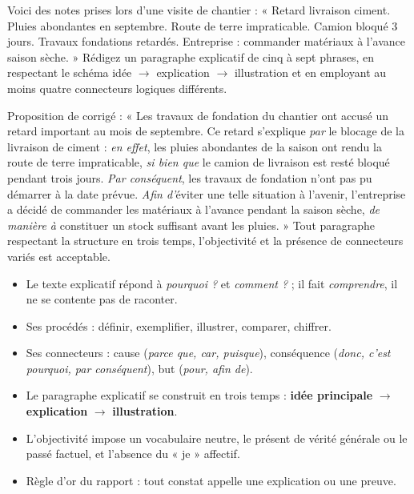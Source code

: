 \documentclass[11pt]{article}
\newcommand{\cle}[1]{{\popxbold\color{popdark}#1}}
\begin{document}
\begin{exercice}
Voici des notes prises lors d'une visite de chantier : « Retard livraison ciment. Pluies abondantes en septembre. Route de terre impraticable. Camion bloqué 3 jours. Travaux fondations retardés. Entreprise : commander matériaux à l'avance saison sèche. » Rédigez un paragraphe explicatif de cinq à sept phrases, en respectant le schéma idée $\rightarrow$ explication $\rightarrow$ illustration et en employant au moins quatre connecteurs logiques différents.
\end{exercice}

\begin{corrige}
Proposition de corrigé : « Les travaux de fondation du chantier ont accusé un retard important au mois de septembre. Ce retard s'explique \emph{par} le blocage de la livraison de ciment : \emph{en effet}, les pluies abondantes de la saison ont rendu la route de terre impraticable, \emph{si bien que} le camion de livraison est resté bloqué pendant trois jours. \emph{Par conséquent}, les travaux de fondation n'ont pas pu démarrer à la date prévue. \emph{Afin d'}éviter une telle situation à l'avenir, l'entreprise a décidé de commander les matériaux à l'avance pendant la saison sèche, \emph{de manière à} constituer un stock suffisant avant les pluies. » Tout paragraphe respectant la structure en trois temps, l'objectivité et la présence de connecteurs variés est acceptable.
\end{corrige}

\begin{aretenir}
\begin{itemize}
\item Le texte explicatif répond à \emph{pourquoi ?} et \emph{comment ?} ; il fait \emph{comprendre}, il ne se contente pas de raconter.
\item Ses procédés : \cle{définir}, \cle{exemplifier}, \cle{illustrer}, \cle{comparer}, \cle{chiffrer}.
\item Ses connecteurs : cause (\emph{parce que, car, puisque}), conséquence (\emph{donc, c'est pourquoi, par conséquent}), but (\emph{pour, afin de}).
\item Le paragraphe explicatif se construit en trois temps : \textbf{idée principale} $\rightarrow$ \textbf{explication} $\rightarrow$ \textbf{illustration}.
\item L'objectivité impose un vocabulaire neutre, le présent de vérité générale ou le passé factuel, et l'absence du « je » affectif.
\item Règle d'or du rapport : tout constat appelle une explication ou une preuve.
\end{itemize}
\end{aretenir}
\end{document}

